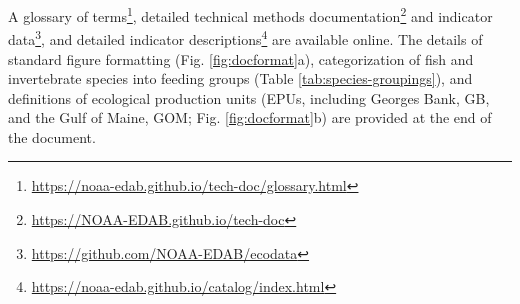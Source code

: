 \documentclass[
  10pt,
]{article}
\begin{document}
A glossary of terms\footnote{\url{https://noaa-edab.github.io/tech-doc/glossary.html}}, detailed technical methods documentation\footnote{\url{https://NOAA-EDAB.github.io/tech-doc}} and indicator data\footnote{\url{https://github.com/NOAA-EDAB/ecodata}}, and detailed indicator descriptions\footnote{\url{https://noaa-edab.github.io/catalog/index.html}} are available online. The details of standard figure formatting (Fig. \ref{fig:docformat}a), categorization of fish and invertebrate species into feeding groups (Table \ref{tab:species-groupings}), and definitions of ecological production units (EPUs, including Georges Bank, GB, and the Gulf of Maine, GOM; Fig. \ref{fig:docformat}b) are provided at the end of the document.

\providecommand{\docline}[3]{\noalign{\global\setlength{\arrayrulewidth}{#1}}\arrayrulecolor[HTML]{#2}\cline{#3}}

\setlength{\tabcolsep}{0pt}

\renewcommand*{\arraystretch}{1}
\end{document}
